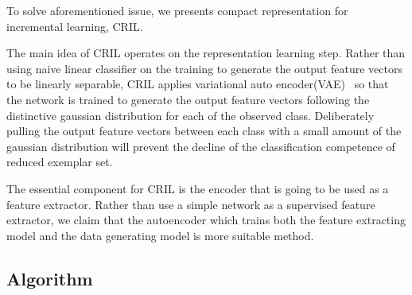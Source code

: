 To solve aforementioned issue, we presents compact representation for incremental learning, CRIL.

The main idea of CRIL operates on the representation learning step. Rather than using naive linear classifier on the training to generate the output feature vectors to be linearly separable, CRIL applies variational auto encoder(VAE)~\cite{Kingma:2013aa} so that the network is trained to generate the output feature vectors following the distinctive gaussian distribution for each of the observed class. Deliberately pulling the output feature vectors between each class with a small amount of the gaussian distribution will prevent the decline of the classification competence of reduced exemplar set.

The essential component for CRIL is the encoder that is going to be used as a feature extractor. Rather than use a simple network as a supervised feature extractor, we claim that the autoencoder which trains both the feature extracting model and the data generating model is more suitable method.

\subsection{Algorithm} %
\label{sec:algorithm}
